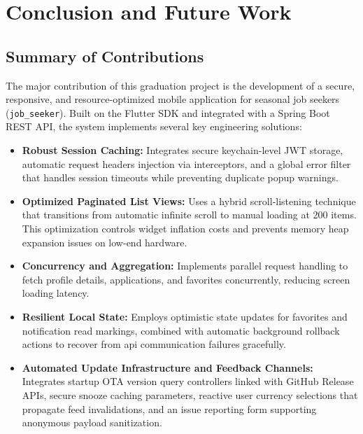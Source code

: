 \chapter{Conclusion and Future Work}
\label{ch:conclusion_and_future_work}

\section{Summary of Contributions}
The major contribution of this graduation project is the development of a secure, responsive, and resource-optimized mobile application for seasonal job seekers (\texttt{job\_seeker}). Built on the Flutter SDK and integrated with a Spring Boot REST API, the system implements several key engineering solutions:
\begin{itemize}
    \item \textbf{Robust Session Caching:} Integrates secure keychain-level JWT storage, automatic request headers injection via interceptors, and a global error filter that handles session timeouts while preventing duplicate popup warnings.
    \item \textbf{Optimized Paginated List Views:} Uses a hybrid scroll-listening technique that transitions from automatic infinite scroll to manual loading at 200 items. This optimization controls widget inflation costs and prevents memory heap expansion issues on low-end hardware.
    \item \textbf{Concurrency and Aggregation:} Implements parallel request handling to fetch profile details, applications, and favorites concurrently, reducing screen loading latency.
    \item \textbf{Resilient Local State:} Employs optimistic state updates for favorites and notification read markings, combined with automatic background rollback actions to recover from api communication failures gracefully.
    \item \textbf{Automated Update Infrastructure and Feedback Channels:} Integrates startup OTA version query controllers linked with GitHub Release APIs, secure snooze caching parameters, reactive user currency selections that propagate feed invalidations, and an issue reporting form supporting anonymous payload sanitization.
\end{itemize}

